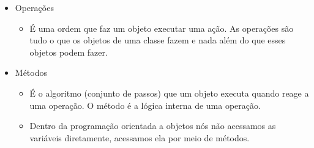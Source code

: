 \documentclass[12pt]{article}
\begin{document}
\begin{itemize}
\begin{itemize}
        \item É uma caracteristica particular que os objetos de uma classe 
        possuem, assumindo valores diferentes para cada objeto.
    \end{itemize}
    \item Operações
    \begin{itemize}
        \item É uma ordem que faz um objeto executar uma ação. As operações são 
        tudo o que os objetos de uma classe fazem e nada além do que esses objetos 
        podem fazer.
    \end{itemize}
    \item Métodos
    \begin{itemize}
        \item É o algoritmo (conjunto de passos) que um objeto executa quando 
        reage a uma operação. O método é a lógica interna de uma operação.
        \item Dentro da programação orientada a objetos nós não acessamos as 
        variáveis diretamente, acessamos ela por meio de métodos.
    \end{itemize}
    
\end{itemize}
\end{document}
